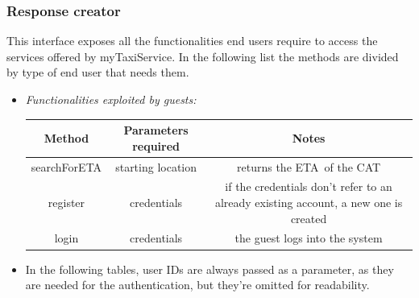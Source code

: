 \documentclass{article}
\begin{document}
\subsubsection{Response creator}
This interface exposes all the functionalities end users require to access the services offered by myTaxiService. 
In the following list the methods are divided by type of end user that needs them. 
\begin{itemize}
	\item \textit{Functionalities exploited by guests:}	\\
	\begin{table}[H]
		\begin{adjustbox}{width=1.2\textwidth}
			\begin{tabular}{*{3}{c}}
				\toprule
				Method & Parameters required & Notes \\
				\midrule
				searchForETA & starting location & returns the ETA\footnotemark\  of the CAT\footnotemark\\ %
				register & credentials & if the credentials don't refer to an already existing account, a new one is created \\
				login & credentials & the guest logs into the system \\
				\bottomrule
			\end{tabular}
	\end{adjustbox}
\end{table}

	\item In the following tables, user IDs are always passed as a parameter, as they are needed for the authentication, but they're omitted for readability. \\	


\end{itemize}
\end{document}
